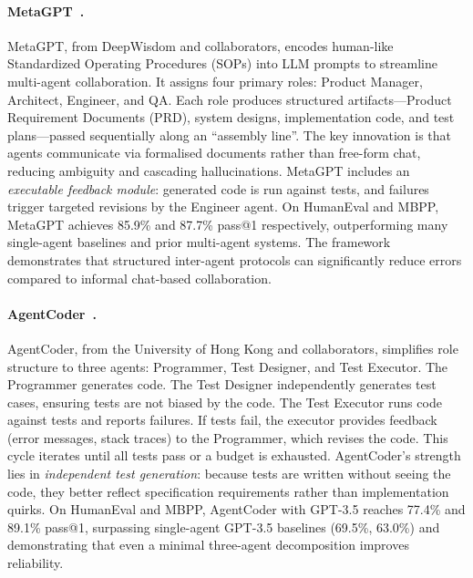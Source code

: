 \paragraph{MetaGPT~\cite{hong2024metagpt}.}
MetaGPT, from DeepWisdom and collaborators, encodes human-like Standardized
Operating Procedures (SOPs) into LLM prompts to streamline multi-agent
collaboration. It assigns four primary roles: Product Manager, Architect,
Engineer, and QA. Each role produces structured artifacts---Product Requirement
Documents (PRD), system designs, implementation code, and test plans---passed
sequentially along an ``assembly line''. The key innovation is that agents
communicate via formalised documents rather than free-form chat, reducing
ambiguity and cascading hallucinations. MetaGPT includes an \emph{executable
feedback module}: generated code is run against tests, and failures trigger
targeted revisions by the Engineer agent. On HumanEval and MBPP, MetaGPT
achieves 85.9\% and 87.7\% pass@1 respectively, outperforming many single-agent
baselines and prior multi-agent systems. The framework demonstrates that
structured inter-agent protocols can significantly reduce errors compared to
informal chat-based collaboration.

\paragraph{AgentCoder~\cite{huang2023agentcoder}.}
AgentCoder, from the University of Hong Kong and collaborators, simplifies role
structure to three agents: Programmer, Test Designer, and Test Executor. The
Programmer generates code. The Test Designer independently generates test
cases, ensuring tests are not biased by the code. The Test Executor runs code
against tests and reports failures. If tests fail, the executor provides
feedback (error messages, stack traces) to the Programmer, which revises the
code. This cycle iterates until all tests pass or a budget is exhausted.
AgentCoder's strength lies in \emph{independent test generation}: because tests
are written without seeing the code, they better reflect specification
requirements rather than implementation quirks. On HumanEval and MBPP,
AgentCoder with GPT-3.5 reaches 77.4\% and 89.1\% pass@1, surpassing
single-agent GPT-3.5 baselines (69.5\%, 63.0\%) and demonstrating that even a
minimal three-agent decomposition improves reliability.

